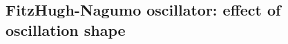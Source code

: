 

\subsection{FitzHugh-Nagumo oscillator: effect of oscillation shape}
\label{subsec:analysis-characterisation-acf-fhn}

%


